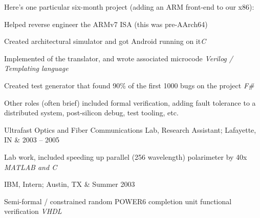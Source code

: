 \documentclass[letterpaper]{scrartcl}
\begin{document}
\begin{list1}
  \begin{list2}
  \item Here's one particular six-month project (adding an ARM front-end to our x86):
    \begin{list3}
    \item Helped reverse engineer the ARMv7 ISA (this was pre-AArch64)
    \item Created architectural simulator and got Android running on it\hfill \emph{C}
    \item Implemented  of the translator, and wrote associated microcode \hfill \emph{Verilog / Templating language}
    \item Created test generator that found 90\% of the first 1000 bugs on the project \hfill \emph{F\#}
    \end{list3}
  \item Other roles (often brief) included formal verification, adding fault tolerance to a distributed system, post-silicon debug, test tooling, etc.

  \end{list2}

\item \begin{tabular1bold} Ultrafast Optics and Fiber Communications Lab, Research Assistant; Lafayette, IN & 2003 -- 2005 \end{tabular1bold}

  \begin{list2}
  \item Lab work, included speeding up parallel (256 wavelength) polarimeter by 40x  \hfill \emph{MATLAB and C}
  \end{list2}

\item \begin{tabular1bold} IBM, Intern; Austin, TX & Summer 2003 \end{tabular1bold}

  \begin{list2}
  \item Semi-formal / constrained random POWER6 completion unit functional verification \hfill \emph{VHDL}
  \end{list2}


\end{list1}
\end{document}
